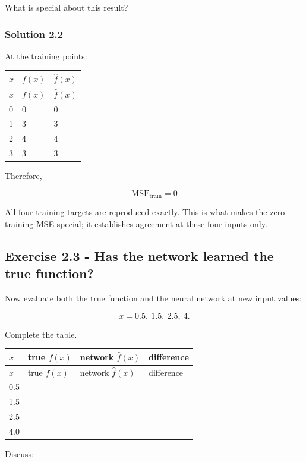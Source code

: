 \documentclass[10pt]{article}
\begin{document}
What is special about this result?

\begingroup\color{red}

\subsubsection*{Solution 2.2}
At the training points:

\begingroup
\small
\setlength{\tabcolsep}{4pt}
\begin{longtable}{l|l|l}
$x$ & $f(x)$ & $\hat f(x)$ \\[1.5pt]
\hline
\endfirsthead
$x$ & $f(x)$ & $\hat f(x)$ \\[1.5pt]
\hline
\endhead
0 & 0 & 0 \\[1.5pt]
1 & 3 & 3 \\[1.5pt]
2 & 4 & 4 \\[1.5pt]
3 & 3 & 3 \\[1.5pt]
\end{longtable}
\endgroup
Therefore,

\[
\mathrm{MSE}_{\mathrm{train}}=0
\]


All four training targets are reproduced exactly. This is what makes the zero training MSE special; it establishes agreement at these four inputs only.
\par\endgroup

\subsection*{Exercise 2.3 - Has the network learned the true function?}
Now evaluate both the true function and the neural network at new input values:

\[
x=0.5,\ 1.5,\ 2.5,\ 4.
\]

Complete the table.

\begingroup
\small
\setlength{\tabcolsep}{4pt}
\begin{longtable}{l|l|l|l}
$x$ & true $f(x)$ & network $\hat f(x)$ & difference \\[1.5pt]
\hline
\endfirsthead
$x$ & true $f(x)$ & network $\hat f(x)$ & difference \\[1.5pt]
\hline
\endhead
\rule{0pt}{2.4ex}0.5 &  $\phantom{-0.00}$ &  $\phantom{-0.00}$ &  $\phantom{-0.00}$ \\[3pt]
\rule{0pt}{2.4ex}1.5 &  $\phantom{-0.00}$ &  $\phantom{-0.00}$ &  $\phantom{-0.00}$ \\[3pt]
\rule{0pt}{2.4ex}2.5 &  $\phantom{-0.00}$ &  $\phantom{-0.00}$ &  $\phantom{-0.00}$ \\[3pt]
\rule{0pt}{2.4ex}4.0 &  $\phantom{-0.00}$ &  $\phantom{-0.00}$ &  $\phantom{-0.00}$ \\[3pt]
\end{longtable}
\endgroup
Discuss:
\end{document}
